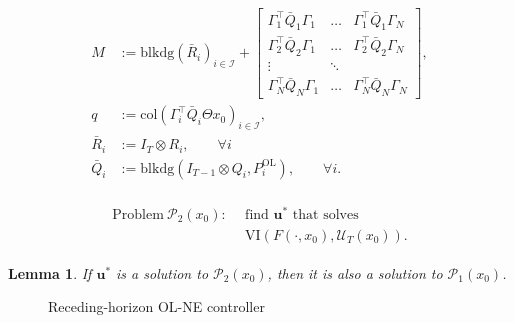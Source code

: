 \documentclass[letterpaper, 10 pt, conference]{ieeeconf}  %
\newcommand{\mc}{\mathcal}
\newcommand{\col}{\mathrm{col}}
\newcommand{\Pol}{P^{\mathrm{OL}}}
\newcommand{\bu}{\boldsymbol{u}}
\newcommand{\VI}{\mathrm{VI}}
\newcommand{\blkdiag}{\mathrm{blkdg}}
\newtheorem{lemma}{Lemma}
\begin{document}
    \begin{align}\label{eq:def_VI_matrices}
    \begin{split}
        M&:= \mathrm{blkdg}(\bar{R}_i)_{i\in\mc I} + \begin{bmatrix}
            \Gamma_1^\top\bar{Q}_1\Gamma_1 & \dots &\Gamma_1^\top\bar{Q}_1\Gamma_N \\
            \Gamma_2^\top\bar{Q}_2\Gamma_1 & \dots & \Gamma_2^\top\bar{Q}_2\Gamma_N \\
            \vdots & \ddots & \\
            \Gamma_N^\top\bar{Q}_N\Gamma_1 & \dots & \Gamma_N^\top\bar{Q}_N\Gamma_N
        \end{bmatrix}, \\
        q&:= \col(\Gamma_i^{\top}\bar{Q}_i\Theta x_0)_{i\in\mc I},\\
        \bar{R}_i&:= I_T\otimes R_i, \qquad \forall i\\
        \bar{Q}_i&:= \blkdiag(I_{T-1}\otimes Q_i, \Pol_i), \qquad \forall i.
    \end{split}
    \end{align}

\begin{align}\label{eq:def_P2}
\begin{split}
    \text{Problem}~ \mc P_2(x_0):~~&\text{find $\bu^*$ that solves}\\&\VI(F(\cdot, x_0), \mc{U}_T(x_0)). 
\end{split}
\end{align}

\begin{lemma}\cite[Proposition 2]{benenati2024linear}\label{lem: OL-NE as VI}
    If $\bu^*$ is a solution to $\mc P_2(x_0)$, then it is also a solution to  $\mc P_1(x_0)$.
\end{lemma}

\begin{figure}
    \centering
    \centering\resizebox{.7\columnwidth}{!}{}
    \caption{Receding-horizon OL-NE controller}
    \label{fig:block_scheme}
\end{figure}
\end{document}
